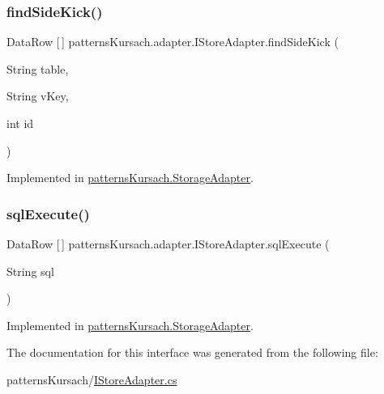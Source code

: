 \mbox{\label{interfacepatterns_kursach_1_1adapter_1_1_i_store_adapter_aa213143da13c4772d0aa695ece08b3ac}} 
\subsubsection{\texorpdfstring{find\+Side\+Kick()}{findSideKick()}}
{\footnotesize\ttfamily Data\+Row \mbox{[}$\,$\mbox{]} patterns\+Kursach.\+adapter.\+I\+Store\+Adapter.\+find\+Side\+Kick (\begin{DoxyParamCaption}\item[{String}]{table,  }\item[{String}]{v\+Key,  }\item[{int}]{id }\end{DoxyParamCaption})}



Implemented in \mbox{\hyperlink{classpatterns_kursach_1_1_storage_adapter_a25fff62c20799364eebdb38515169fb1}{patterns\+Kursach.\+Storage\+Adapter}}.

\mbox{\label{interfacepatterns_kursach_1_1adapter_1_1_i_store_adapter_a2f461380a248778258d993f8dc1eb265}} 
\subsubsection{\texorpdfstring{sql\+Execute()}{sqlExecute()}}
{\footnotesize\ttfamily Data\+Row \mbox{[}$\,$\mbox{]} patterns\+Kursach.\+adapter.\+I\+Store\+Adapter.\+sql\+Execute (\begin{DoxyParamCaption}\item[{String}]{sql }\end{DoxyParamCaption})}



Implemented in \mbox{\hyperlink{classpatterns_kursach_1_1_storage_adapter_a6ad39a4e1cc12887ba0f3f8563032c6d}{patterns\+Kursach.\+Storage\+Adapter}}.



The documentation for this interface was generated from the following file\+:\begin{DoxyCompactItemize}
\item 
patterns\+Kursach/\mbox{\hyperlink{_i_store_adapter_8cs}{I\+Store\+Adapter.\+cs}}\end{DoxyCompactItemize}
